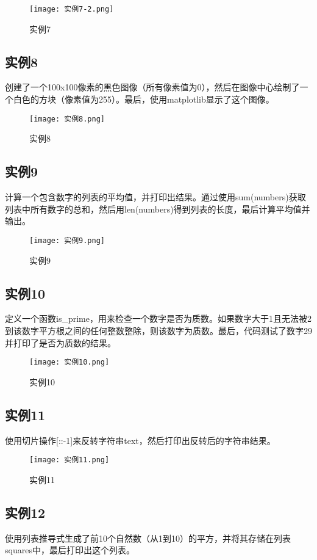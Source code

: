 \documentclass[a4paper, 12pt]{article}
\begin{document}
\begin{figure}[h!]
  \centering
  \texttt{[image: 实例7-2.png]}
  \caption{实例7}
\end{figure}

\subsection{实例8}
创建了一个100x100像素的黑色图像（所有像素值为0），然后在图像中心绘制了一个白色的方块（像素值为255）。最后，使用matplotlib显示了这个图像。

\begin{figure}[h!]
  \centering
  \texttt{[image: 实例8.png]}
  \caption{实例8}
\end{figure}

\subsection{实例9}
计算一个包含数字的列表的平均值，并打印出结果。通过使用sum(numbers)获取列表中所有数字的总和，然后用len(numbers)得到列表的长度，最后计算平均值并输出。

\begin{figure}[h!]
  \centering
  \texttt{[image: 实例9.png]}
  \caption{实例9}
\end{figure}

\subsection{实例10}
定义一个函数is\_prime，用来检查一个数字是否为质数。如果数字大于1且无法被2到该数字平方根之间的任何整数整除，则该数字为质数。最后，代码测试了数字29并打印了是否为质数的结果。

\begin{figure}[h!]
  \centering
  \texttt{[image: 实例10.png]}
  \caption{实例10}
\end{figure}

\subsection{实例11}
使用切片操作[::-1]来反转字符串text，然后打印出反转后的字符串结果。

\begin{figure}[h!]
  \centering
  \texttt{[image: 实例11.png]}
  \caption{实例11}
\end{figure}

\subsection{实例12}
使用列表推导式生成了前10个自然数（从1到10）的平方，并将其存储在列表squares中，最后打印出这个列表。
\end{document}
